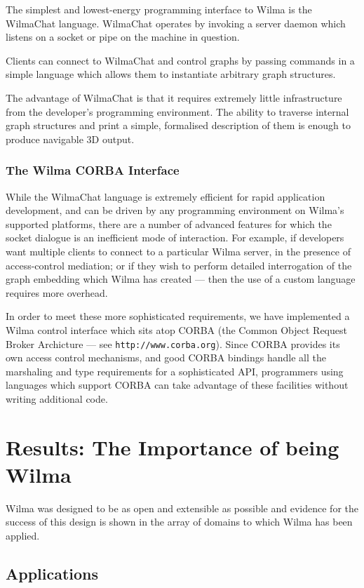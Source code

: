 \documentclass[runningheads]{cl2emult}
\newcommand{\url}[1]{{\small{\tt #1}}}
\begin{document}
The simplest and lowest-energy programming interface to Wilma is the WilmaChat
language.  WilmaChat operates by invoking a server daemon which listens on a
socket or pipe on the machine in question.

Clients can connect to WilmaChat and control graphs by passing commands
in a simple language which allows them to instantiate arbitrary graph
structures.

The advantage of WilmaChat is that it requires extremely little infrastructure
from the developer's programming environment.  The ability to traverse
internal graph structures and print a simple, formalised description of them
is enough to produce navigable 3D output.

\subsubsection{The Wilma CORBA Interface}

While the WilmaChat language is extremely efficient for rapid application
development, and can be driven by any programming environment on Wilma's
supported platforms, there are a number of advanced features for which the
socket dialogue is an inefficient mode of interaction.  For example, if
developers want multiple clients to connect to a particular Wilma server, in
the presence of access-control mediation; or if they wish to perform detailed
interrogation of the graph embedding which Wilma has created --- then the use
of a custom language requires more overhead.

In order to meet these more sophisticated requirements, we have implemented a
Wilma control interface which sits atop CORBA (the Common Object Request
Broker Archicture --- see \url{http://www.corba.org}).  Since CORBA provides
its own access control mechanisms, and good CORBA bindings handle all the
marshaling and type requirements for a sophisticated API, programmers using
languages which support CORBA can take advantage of these facilities without
writing additional code.

\section{Results: The Importance of being Wilma}
\label{sec:results}
Wilma was designed to be as open and extensible as possible and
evidence for the success of this design is shown in the array of
domains to which Wilma has been applied.

\subsection{Applications}
\end{document}
